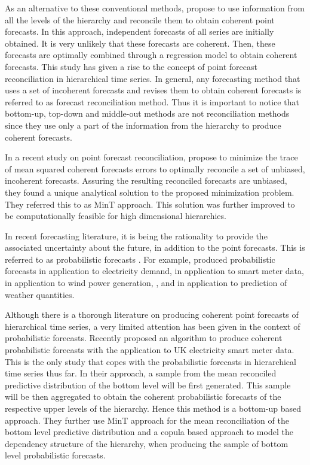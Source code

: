 \documentclass[a4paper, 11pt]{article}
\begin{document}
As an alternative to these conventional methods, \citet{Hyndman2011} propose to use information from all the levels of the hierarchy and reconcile them to obtain coherent point forecasts. In this approach, independent forecasts of all series are initially obtained. It is very unlikely that these forecasts are coherent. Then, these forecasts are optimally combined through a regression model to obtain coherent forecasts. This study has given a rise to the concept of point forecast reconciliation in hierarchical time series. In general, any forecasting method that uses a set of incoherent forecasts and revises them to obtain coherent forecasts is referred to as forecast reconciliation method. Thus it is important to notice that bottom-up, top-down and middle-out methods are not reconciliation methods since they use only a part of the information from the hierarchy to produce coherent forecasts.

In a recent study on point forecast reconciliation, \citet{Wickramasuriya2017} propose to minimize the trace of mean squared coherent forecasts errors to optimally reconcile a set of unbiased, incoherent forecasts. Assuring the resulting reconciled forecasts are unbiased, they found a unique analytical solution to the proposed minimization problem. They referred this to as MinT approach. This solution was further improved to be computationally feasible for high dimensional hierarchies.

In recent forecasting literature, it is being the rationality to provide the associated uncertainty about the future, in addition to the point forecasts. This is referred to as probabilistic forecasts \citep{Gneiting2014}. For example, \citet{McSharry2005} produced probabilistic forecasts in application to electricity demand, \citet{BenTaieb2017} in application to smart meter data, \citet{Pinson2009} in application to wind power generation, \citet{Gel2004}, \citet{Gneiting2005a} and \citet{Gneiting2005} in application to prediction of weather quantities.

Although there is a thorough literature on producing coherent point forecasts of hierarchical time series, a very limited attention has been given in the context of probabilistic forecasts. Recently \citet{BenTaieb2017} proposed an algorithm to produce coherent probabilistic forecasts with the application to UK electricity smart meter data. This is the only study that copes with the probabilistic forecasts in hierarchical time series thus far. In their approach, a sample from the mean reconciled predictive distribution of the bottom level will be first generated. This sample will be then aggregated to obtain the coherent probabilistic forecasts of the respective upper levels of the hierarchy. Hence this method is a bottom-up based approach. They further use MinT approach for the mean reconciliation of the bottom level predictive distribution and a copula based approach to model the dependency structure of the hierarchy, when producing the sample of bottom level probabilistic forecasts.
\end{document}
